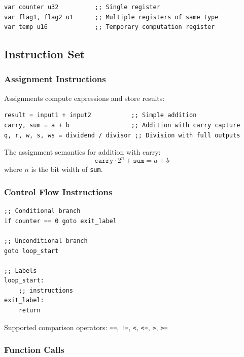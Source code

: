 \documentclass[11pt,a4paper]{article}
\begin{document}
\begin{lstlisting}[style=zkasm,caption={Register Declarations}]
var counter u32          ;; Single register
var flag1, flag2 u1      ;; Multiple registers of same type
var temp u16             ;; Temporary computation register
\end{lstlisting}

\subsection{Instruction Set}

\subsubsection{Assignment Instructions}

Assignments compute expressions and store results:

\begin{lstlisting}[style=zkasm,caption={Assignment Examples}]
result = input1 + input2           ;; Simple addition
carry, sum = a + b                 ;; Addition with carry capture
q, r, w, s, ws = dividend / divisor ;; Division with full outputs
\end{lstlisting}

The assignment semantics for addition with carry:
\begin{equation}
\texttt{carry} \cdot 2^n + \texttt{sum} = a + b
\end{equation}
where $n$ is the bit width of \texttt{sum}.

\subsubsection{Control Flow Instructions}

\begin{lstlisting}[style=zkasm,caption={Control Flow Examples}]
;; Conditional branch
if counter == 0 goto exit_label

;; Unconditional branch
goto loop_start

;; Labels
loop_start:
    ;; instructions
exit_label:
    return
\end{lstlisting}

Supported comparison operators: \texttt{==}, \texttt{!=}, \texttt{<}, \texttt{<=}, \texttt{>}, \texttt{>=}

\subsubsection{Function Calls}
\end{document}
